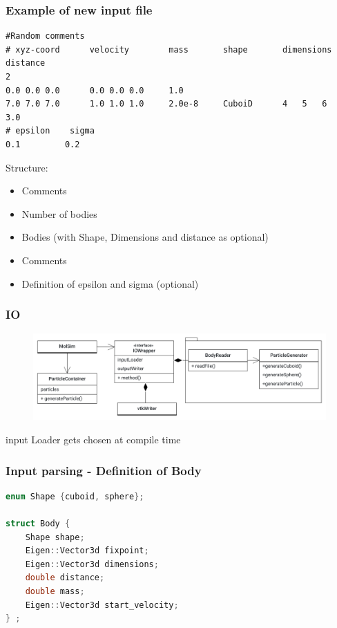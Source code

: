 

\begin{frame}[fragile]
\frametitle{Example of new input file}

 \begin{Verbatim}
#Random comments
# xyz-coord      velocity        mass       shape       dimensions      distance  
2
0.0 0.0 0.0      0.0 0.0 0.0     1.0
7.0 7.0 7.0      1.0 1.0 1.0     2.0e-8     CuboiD      4	5	6         3.0
# epsilon    sigma
0.1         0.2
 \end{Verbatim}

\vspace{-0.5cm}
\large
Structure:
\vspace{-0.7cm}
\begin{itemize}
	\item<1-> Comments
	\item<1-> Number of bodies
	\item<2-> Bodies (with Shape, Dimensions and distance as optional)
	\item<3-> Comments
	\item<4- > Definition of epsilon and sigma (optional)
\end{itemize}

\end{frame}

\begin{frame}
	\frametitle{IO}
	\begin{figure}
		\centering
		\includegraphics[width=0.7\linewidth]{IOWrapper}
		\label{fig:iowrapper}
	\end{figure}
	\large
	\centering
	input Loader gets chosen at compile time
\end{frame}


\begin{frame}[fragile]
\frametitle{Input parsing - Definition of Body}
\vspace{0.7cm}

\begin{lstlisting}[language=C++]
enum Shape {cuboid, sphere};

struct Body {
	Shape shape;   
	Eigen::Vector3d fixpoint; 
	Eigen::Vector3d dimensions; 
	double distance;
	double mass;
	Eigen::Vector3d start_velocity;
} ;
\end{lstlisting}
\end{frame}

